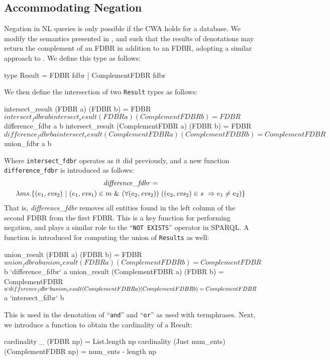 \documentclass[../main.tex]{subfiles}
\begin{document}
\begin{refsection}
\section{Accommodating Negation}
\label{webist2020conf:negation}
\noindent Negation in NL queries is only possible if the CWA holds for a database.  We modify
the semantics presented in \cite{frostpeelar2019}, \cite{frost2018extensible} and \cite{peelar2020compositional} such that the results of denotations may return the complement of an FDBR in addition to an FDBR, adopting a similar approach to \cite{frostboulos2002}.  We define this type as follows:
\begin{code}
    type Result = FDBR fdbr | ComplementFDBR fdbr
\end{code}
We then define the intersection of two \texttt{Result} types as follows:
\begin{code}
    intersect_result (FDBR a) (FDBR b)
      = FDBR $ intersect_fdbr a b
    intersect_result (FDBR a) (ComplementFDBR b)
      = FDBR $ difference_fdbr a b
    intersect_result (ComplementFDBR a) (FDBR b)
      = FDBR $ difference_fdbr b a
    intersect_result (ComplementFDBR a) (ComplementFDBR b)
      = ComplementFDBR $ union_fdbr a b
\end{code}
Where \texttt{intersect\_fdbr} operates as it did previously, and a new function \linebreak \texttt{difference\_fdbr} is introduced as follows:
\begin{multline*}
\operatorname{\mathit{difference\_fdbr}} = \\ \lambda ms.\{(e_1,\operatorname{\mathit{evs}}_2)\ |\ (e_1,\operatorname{\mathit{evs}}_1) \in m\ \&\ (\forall(e_2, \operatorname{\mathit{evs}}_2))\ ((e_2,\operatorname{\mathit{evs}}_2) \in s\ \Rightarrow e_1 \neq e_2)\}
\end{multline*}
That is, \textit{difference\_fdbr} removes all entities found in the left column of the second FDBR from the first FDBR.  This is a key function for performing negation, and plays a similar role to the ``\texttt{NOT EXISTS}'' operator in SPARQL.  A function is introduced for computing the union of \texttt{Results} as well:
\begin{code}
    union_result (FDBR a) (FDBR b)
      = FDBR $ union_fdbr a b
    union_result (FDBR a) (ComplementFDBR b)
      = ComplementFDBR $ b `difference_fdbr` a
    union_result (ComplementFDBR a) (FDBR b)
      = ComplementFDBR $ a `difference_fdbr` b
    union_result (ComplementFDBR a) (ComplementFDBR b)
      = ComplementFDBR $ a `intersect_fdbr` b
\end{code}
This is used in the denotation of ``\texttt{and}'' and ``\texttt{or}'' as used with termphrases.
Next, we introduce a function to obtain the cardinality of a Result:
\begin{code}
    cardinality _ (FDBR np) = List.length np
    cardinality (Just num_ents) (ComplementFDBR np)
    = num_ents - length np
\end{code}


\end{refsection}
\end{document}
